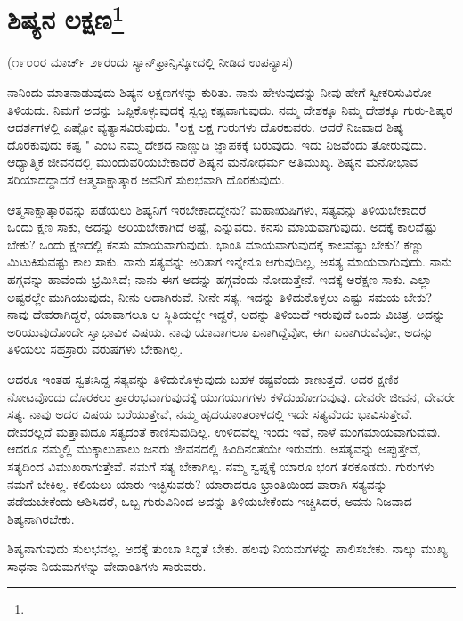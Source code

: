 
\chapter[ಶಿಷ್ಯನ ಲಕ್ಷಣ]{ಶಿಷ್ಯನ ಲಕ್ಷಣ\protect\footnote{}}

\begin{center}
(೧೯೦೦ರ ಮಾರ್ಚ್ ೨೯ರಂದು ಸ್ಯಾನ್‌ಫ್ರಾನ್ಸಿಸ್ಕೋದಲ್ಲಿ ನೀಡಿದ ಉಪನ್ಯಾಸ)
\end{center}

ನಾನಿಂದು ಮಾತನಾಡುವುದು ಶಿಷ್ಯನ ಲಕ್ಷಣಗಳನ್ನು ಕುರಿತು. ನಾನು ಹೇಳುವುದನ್ನು ನೀವು ಹೇಗೆ ಸ್ವೀಕರಿಸುವಿರೋ ತಿಳಿಯದು. ನಿಮಗೆ ಅದನ್ನು ಒಪ್ಪಿಕೊಳ್ಳುವುದಕ್ಕೆ ಸ್ವಲ್ಪ ಕಷ್ಟವಾಗುವುದು. ನಮ್ಮ ದೇಶಕ್ಕೂ ನಿಮ್ಮ ದೇಶಕ್ಕೂ ಗುರು-ಶಿಷ್ಯರ ಆದರ್ಶಗಳಲ್ಲಿ ಎಷ್ಟೋ ವ್ಯತ್ಯಾಸವಿರುವುದು. "ಲಕ್ಷ ಲಕ್ಷ ಗುರುಗಳು ದೊರಕುವರು. ಆದರೆ ನಿಜವಾದ ಶಿಷ್ಯ ದೊರಕುವುದು ಕಷ್ಟ " ಎಂಬ ನಮ್ಮ ದೇಶದ ನಾಣ್ಣುಡಿ ಜ್ಞಾಪಕಕ್ಕೆ ಬರುವುದು. ಇದು ನಿಜವೆಂದು ತೋರುವುದು. ಆಧ್ಯಾತ್ಮಿಕ ಜೀವನದಲ್ಲಿ ಮುಂದುವರಿಯಬೇಕಾದರೆ ಶಿಷ್ಯನ ಮನೋಧರ್ಮ ಅತಿಮುಖ್ಯ. ಶಿಷ್ಯನ ಮನೋಭಾವ ಸರಿಯಾದದ್ದಾದರೆ ಆತ್ಮಸಾಕ್ಷಾತ್ಕಾರ ಅವನಿಗೆ ಸುಲಭವಾಗಿ ದೊರಕುವುದು.

ಆತ್ಮಸಾಕ್ಷಾತ್ಕಾರವನ್ನು ಪಡೆಯಲು ಶಿಷ್ಯನಿಗೆ ಇರಬೇಕಾದದ್ದೇನು? ಮಹಾಋಷಿಗಳು, ಸತ್ಯವನ್ನು ತಿಳಿಯಬೇಕಾದರೆ ಒಂದು ಕ್ಷಣ ಸಾಕು, ಅದನ್ನು ಅರಿಯಬೇಕಾಗಿದೆ ಅಷ್ಟೆ, ಎನ್ನುವರು. ಕನಸು ಮಾಯವಾಗುವುದು. ಅದಕ್ಕೆ ಕಾಲವೆಷ್ಟು ಬೇಕು? ಒಂದು ಕ್ಷಣದಲ್ಲಿ ಕನಸು ಮಾಯವಾಗುವುದು. ಭಾಂತಿ ಮಾಯವಾಗುವುದಕ್ಕೆ ಕಾಲವೆಷ್ಟು ಬೇಕು? ಕಣ್ಣು ಮಿಟುಕಿಸುವಷ್ಟು ಕಾಲ ಸಾಕು. ನಾನು ಸತ್ಯವನ್ನು ಅರಿತಾಗ ಇನ್ನೇನೂ ಆಗುವುದಿಲ್ಲ, ಅಸತ್ಯ ಮಾಯವಾಗುವುದು. ನಾನು ಹಗ್ಗವನ್ನು ಹಾವೆಂದು ಭ್ರಮಿಸಿದೆ; ನಾನು ಈಗ ಅದನ್ನು ಹಗ್ಗವೆಂದು ನೋಡುತ್ತೇನೆ. ಇದಕ್ಕೆ ಅರೆಕ್ಷಣ ಸಾಕು. ಎಲ್ಲಾ ಅಷ್ಟರಲ್ಲೇ ಮುಗಿಯುವುದು, ನೀನು ಅದಾಗಿರುವೆ. ನೀನೇ ಸತ್ಯ. ಇದನ್ನು ತಿಳಿದುಕೊಳ್ಳಲು ಎಷ್ಟು ಸಮಯ ಬೇಕು? ನಾವು ದೇವರಾಗಿದ್ದರೆ, ಯಾವಾಗಲೂ ಆ ಸ್ಥಿತಿಯಲ್ಲೇ ಇದ್ದರೆ, ಅದನ್ನು ತಿಳಿಯದೆ ಇರುವುದೆ ಒಂದು ವಿಚಿತ್ರ. ಅದನ್ನು ಅರಿಯುವುದೊಂದೇ ಸ್ವಾಭಾವಿಕ ವಿಷಯ. ನಾವು ಯಾವಾಗಲೂ ಏನಾಗಿದ್ದೆವೋ, ಈಗ ಏನಾಗಿರುವೆವೋ, ಅದನ್ನು ತಿಳಿಯಲು ಸಹಸ್ರಾರು ವರುಷಗಳು ಬೇಕಾಗಿಲ್ಲ.

ಆದರೂ ಇಂತಹ ಸ್ವತಃಸಿದ್ದ ಸತ್ಯವನ್ನು ತಿಳಿದುಕೊಳ್ಳುವುದು ಬಹಳ ಕಷ್ಟವೆಂದು ಕಾಣುತ್ತದೆ. ಅದರ ಕ್ಷಣಿಕ ನೋಟವೊಂದು ದೊರಕಲು ಪ್ರಾರಂಭವಾಗುವುದಕ್ಕೆ ಯುಗಯುಗಗಳು ಕಳೆದುಹೋಗುವುವು. ದೇವರೇ ಜೀವನ, ದೇವರೇ ಸತ್ಯ. ನಾವು ಅದರ ವಿಷಯ ಬರೆಯುತ್ತೇವೆ, ನಮ್ಮ ಹೃದಯಾಂತರಾಳದಲ್ಲಿ ಇದೇ ಸತ್ಯವೆಂದು ಭಾವಿಸುತ್ತೇವೆ. ದೇವರಲ್ಲದೆ ಮತ್ತಾವುದೂ ಸತ್ಯದಂತೆ ಕಾಣಿಸುವುದಿಲ್ಲ. ಉಳಿದವೆಲ್ಲ ಇಂದು ಇವೆ, ನಾಳೆ ಮಂಗಮಾಯವಾಗುವುವು. ಆದರೂ ನಮ್ಮಲ್ಲಿ ಮುಕ್ಕಾಲುಪಾಲು ಜನರು ಜೀವನದಲ್ಲಿ ಹಿಂದಿನಂತೆಯೇ ಇರುವರು. ಅಸತ್ಯವನ್ನು ಅಪ್ಪುತ್ತೇವೆ, ಸತ್ಯದಿಂದ ವಿಮುಖರಾಗುತ್ತೇವೆ. ನಮಗೆ ಸತ್ಯ ಬೇಕಾಗಿಲ್ಲ. ನಮ್ಮ ಸ್ವಪ್ನಕ್ಕೆ ಯಾರೂ ಭಂಗ ತರಕೂಡದು. ಗುರುಗಳು ನಮಗೆ ಬೇಕಿಲ್ಲ. ಕಲಿಯಲು ಯಾರು ಇಚ್ಛಿಸುವರು? ಯಾರಾದರೂ ಭ್ರಾಂತಿಯಿಂದ ಪಾರಾಗಿ ಸತ್ಯವನ್ನು ಪಡೆಯಬೇಕೆಂದು ಆಶಿಸಿದರೆ, ಒಬ್ಬ ಗುರುವಿನಿಂದ ಅದನ್ನು ತಿಳಿಯಬೇಕೆಂದು ಇಚ್ಚಿಸಿದರೆ, ಅವನು ನಿಜವಾದ ಶಿಷ್ಯನಾಗಿರಬೇಕು.

ಶಿಷ್ಯನಾಗುವುದು ಸುಲಭವಲ್ಲ. ಅದಕ್ಕೆ ತುಂಬಾ ಸಿದ್ದತೆ ಬೇಕು. ಹಲವು ನಿಯಮಗಳನ್ನು ಪಾಲಿಸಬೇಕು. ನಾಲ್ಕು ಮುಖ್ಯ ಸಾಧನಾ ನಿಯಮಗಳನ್ನು ವೇದಾಂತಿಗಳು ಸಾರುವರು.

